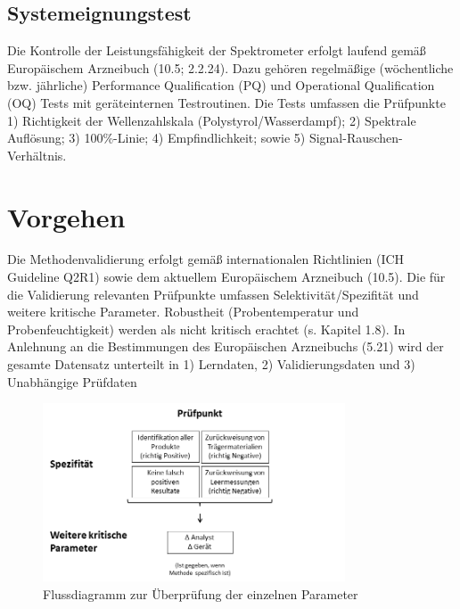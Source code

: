 \documentclass[11pt, a4paper]{article}
\begin{document}
\subsection{Systemeignungstest}
Die Kontrolle der Leistungsfähigkeit der Spektrometer erfolgt laufend gemäß Europäischem Arzneibuch (10.5; 2.2.24). Dazu gehören regelmäßige (wöchentliche bzw. jährliche) Performance Qualification (PQ) und Operational Qualification (OQ) Tests mit geräteinternen Testroutinen. Die Tests umfassen die Prüfpunkte 1) Richtigkeit der Wellenzahlskala (Polystyrol/Wasserdampf); 2) Spektrale Auflösung; 3) 100\%-Linie; 4) Empfindlichkeit; sowie 5) Signal-Rauschen-Verhältnis.


\section{Vorgehen}
Die Methodenvalidierung erfolgt gemäß internationalen Richtlinien (ICH Guideline Q2R1) sowie dem aktuellem Europäischem Arzneibuch (10.5). Die für die Validierung relevanten Prüfpunkte umfassen Selektivität/Spezifität und weitere kritische Parameter. Robustheit (Probentemperatur und Probenfeuchtigkeit) werden als nicht kritisch erachtet (s. Kapitel 1.8). In Anlehnung an die Bestimmungen des Europäischen Arzneibuchs (5.21) wird der gesamte Datensatz unterteilt in 1) Lerndaten, 2) Validierungsdaten und 3) Unabhängige Prüfdaten

\begin{figure}[h]
\begin{center}
\includegraphics[width=0.8\textwidth]{flussdiagram2.png}
\end{center}
\caption{Flussdiagramm zur Überprüfung der einzelnen Parameter}
\label{fig:Sampling_Design}
\end{figure}
\end{document}
